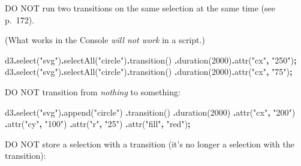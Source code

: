 \documentclass[
  openany]{book}
\newenvironment{Shaded}{\begin{snugshade}}{\end{snugshade}}
\newcommand{\DecValTok}[1]{\textcolor[rgb]{0.00,0.00,0.81}{#1}}
\newcommand{\FunctionTok}[1]{\textcolor[rgb]{0.00,0.00,0.00}{#1}}
\newcommand{\NormalTok}[1]{#1}
\newcommand{\OperatorTok}[1]{\textcolor[rgb]{0.81,0.36,0.00}{\textbf{#1}}}
\newcommand{\StringTok}[1]{\textcolor[rgb]{0.31,0.60,0.02}{#1}}
\begin{document}
DO NOT run two transitions on the same selection at the same time (see p.~172).

(What works in the Console \emph{will not work} in a script.)

\begin{Shaded}
\begin{Highlighting}[]
\NormalTok{d3}\OperatorTok{.}\FunctionTok{select}\NormalTok{(}\StringTok{"svg"}\NormalTok{)}\OperatorTok{.}\FunctionTok{selectAll}\NormalTok{(}\StringTok{"circle"}\NormalTok{)}\OperatorTok{.}\FunctionTok{transition}\NormalTok{()}
    \OperatorTok{.}\FunctionTok{duration}\NormalTok{(}\DecValTok{2000}\NormalTok{)}\OperatorTok{.}\FunctionTok{attr}\NormalTok{(}\StringTok{"cx"}\OperatorTok{,} \StringTok{"250"}\NormalTok{)}\OperatorTok{;}
\NormalTok{d3}\OperatorTok{.}\FunctionTok{select}\NormalTok{(}\StringTok{"svg"}\NormalTok{)}\OperatorTok{.}\FunctionTok{selectAll}\NormalTok{(}\StringTok{"circle"}\NormalTok{)}\OperatorTok{.}\FunctionTok{transition}\NormalTok{()}
    \OperatorTok{.}\FunctionTok{duration}\NormalTok{(}\DecValTok{2000}\NormalTok{)}\OperatorTok{.}\FunctionTok{attr}\NormalTok{(}\StringTok{"cx"}\OperatorTok{,} \StringTok{"75"}\NormalTok{)}\OperatorTok{;}
\end{Highlighting}
\end{Shaded}

DO NOT transition from \emph{nothing} to something:

\begin{Shaded}
\begin{Highlighting}[]
\NormalTok{d3}\OperatorTok{.}\FunctionTok{select}\NormalTok{(}\StringTok{"svg"}\NormalTok{)}\OperatorTok{.}\FunctionTok{append}\NormalTok{(}\StringTok{"circle"}\NormalTok{)}
    \OperatorTok{.}\FunctionTok{transition}\NormalTok{()}
    \OperatorTok{.}\FunctionTok{duration}\NormalTok{(}\DecValTok{2000}\NormalTok{)}
    \OperatorTok{.}\FunctionTok{attr}\NormalTok{(}\StringTok{"cx"}\OperatorTok{,} \StringTok{"200"}\NormalTok{)}
    \OperatorTok{.}\FunctionTok{attr}\NormalTok{(}\StringTok{"cy"}\OperatorTok{,} \StringTok{"100"}\NormalTok{)}
    \OperatorTok{.}\FunctionTok{attr}\NormalTok{(}\StringTok{"r"}\OperatorTok{,} \StringTok{"25"}\NormalTok{)}
    \OperatorTok{.}\FunctionTok{attr}\NormalTok{(}\StringTok{"fill"}\OperatorTok{,} \StringTok{"red"}\NormalTok{)}\OperatorTok{;}
\end{Highlighting}
\end{Shaded}

DO NOT store a selection with a transition (it's no longer a selection with the transition):
\end{document}
